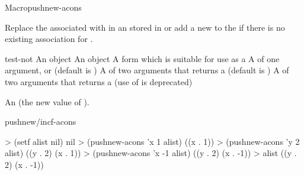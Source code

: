 \documentclass[10pt,twoside,english,pdftex]{article}
\begin{document}
\begin{functiondoc}{Macro}{pushnew-acons}{ 
      \returns{}
    } 
%
%
%
%
  
\fnsyntax

\fnpurpose Replace the  associated with  in an 
 stored in  or add a new   to the  if there is no 
existing association for .

\fnpackage {}

\fnmodule {}

\fnargs
\begin{args}{test-not}
\arg[item] An object
\arg[value] An object
\arg[place] A form which is suitable for use as a
\arg[key] A  of one argument, or \nil{} (default is \nil)
\arg[test] A  of two arguments that returns a
 (default is ) 
 A  of two arguments that returns a
 (use of  is deprecated)
\end{args}

\fnreturns An  (the new value of
). 

\begin{alsos}{pushnew/incf-acons}
\end{alsos}

\fnexamples
\begin{example}
> (setf alist nil)
nil
> (pushnew-acons 'x 1 alist)
((x . 1))
> (pushnew-acons 'y 2 alist)
((y . 2) (x . 1))
> (pushnew-acons 'x -1 alist)
((y . 2) (x . -1))
> alist
((y . 2) (x . -1))
\end{example}

\end{functiondoc}

\end{document}
